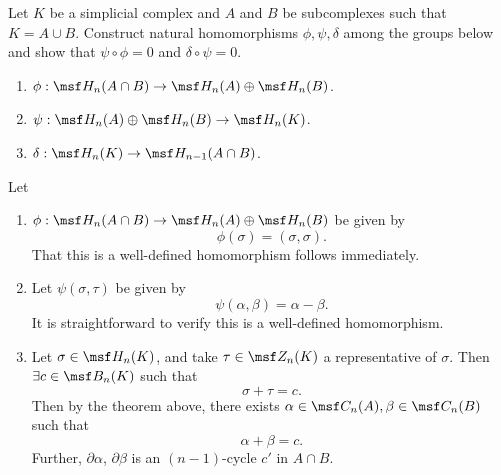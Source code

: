 \begin{problem}[16.36]
  Let $K$ be a simplicial complex and $A$ and $B$ be subcomplexes such
  that $K=A\cup B$. Construct natural homomorphisms $\phi,\psi,\delta$
  among the groups below and show that $\psi \circ \phi =0$ and
  $\delta \circ \psi = 0$.
  \begin{enumerate}
    \item $\phi: \msf H_n(A\cap B)\to \msf H_n(A)\oplus \msf H_n(B)$.
    \item $\psi: \msf H_n(A)\oplus \msf H_n(B)\to \msf H_n(K)$.
    \item $\delta: \msf H_n(K)\to \msf H_{n-1}(A\cap B)$.
  \end{enumerate}
\end{problem}
\begin{solution}
  Let
  \begin{enumerate}[label=(\arabic*)]
    \item $\phi : \msf H_n(A \cap B) \to \msf H_n(A) \oplus \msf
      H_n(B)$ be given by
      \[
        \phi(\sigma) = (\sigma, \sigma).
      \]
      That this is a well-defined homomorphism follows immediately.
    \item Let $\psi(\sigma, \tau)$ be given by
      \[
        \psi(\alpha,\beta) = \alpha - \beta.
      \]
      It is straightforward to verify this is a well-defined
      homomorphism.
    \item Let $\sigma \in \msf H_n(K)$, and take $\tau \in \msf
      Z_n(K)$ a representative of $\sigma$. Then $\exists c \in \msf
      B_n(K)$ such that
      \[
        \sigma + \tau = c.
      \]
      Then by the theorem above, there exists $\alpha \in \msf C_n(A),
      \beta \in \msf C_n(B)$
      such that
      \[
        \alpha + \beta = c.
      \]
      Further, $\partial \alpha$, $\partial \beta$ is an $(n-1)$-cycle
      $c'$ in $A \cap B$.


\end{enumerate}
\end{solution}

